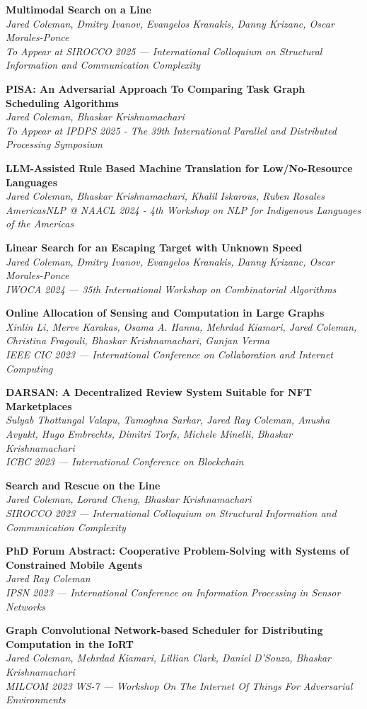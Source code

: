 \documentclass[letterpaper,11pt]{article}
\newcommand{\pub}[3]{
  \vspace{-1pt}\item \textbf{#1} \\ 
    \textit{\small#2} \\
    \textit{\small#3}\vspace{-5pt}
}
\begin{document}
    \pub
    {Multimodal Search on a Line}
    {Jared Coleman, Dmitry Ivanov, Evangelos Kranakis, Danny Krizanc, Oscar Morales-Ponce}
    {To Appear at SIROCCO 2025 --- International Colloquium on Structural Information and Communication Complexity}

    \pub
    {PISA: An Adversarial Approach To Comparing Task Graph Scheduling Algorithms}
    {Jared Coleman, Bhaskar Krishnamachari}
    {To Appear at IPDPS 2025 - The 39th International Parallel and Distributed Processing Symposium}

    \pub
    {LLM-Assisted Rule Based Machine Translation for Low/No-Resource Languages}
    {Jared Coleman, Bhaskar Krishnamachari, Khalil Iskarous, Ruben Rosales}
    {AmericasNLP @ NAACL 2024 - 4th Workshop on NLP for Indigenous Languages of the Americas}

    \pub
    {Linear Search for an Escaping Target with Unknown Speed}
    {Jared Coleman, Dmitry Ivanov, Evangelos Kranakis, Danny Krizanc, Oscar Morales-Ponce}
    {IWOCA 2024 --- 35th International Workshop on Combinatorial Algorithms}

    \pub
    {Online Allocation of Sensing and Computation in Large Graphs}
    {Xinlin Li, Merve Karakas, Osama A. Hanna, Mehrdad Kiamari, Jared Coleman, Christina Fragouli, Bhaskar Krishnamachari, Gunjan Verma}
    {IEEE CIC 2023 --- International Conference on Collaboration and Internet Computing}
    
    \pub
    {DARSAN: A Decentralized Review System Suitable for NFT Marketplaces}
    {Sulyab Thottungal Valapu, Tamoghna Sarkar, Jared Ray Coleman, Anusha Avyukt, Hugo Embrechts, Dimitri Torfs, Michele Minelli, Bhaskar Krishnamachari}
    {ICBC 2023 --- International Conference on Blockchain}

    \pub
    {Search and Rescue on the Line}
    {Jared Coleman, Lorand Cheng, Bhaskar Krishnamachari}
    {SIROCCO 2023 --- International Colloquium on Structural Information and Communication Complexity}

    \pub
    {PhD Forum Abstract: Cooperative Problem-Solving with Systems of Constrained Mobile Agents}
    {Jared Ray Coleman}
    {IPSN 2023 --- International Conference on Information Processing in Sensor Networks}

    \pub
    {Graph Convolutional Network-based Scheduler for Distributing Computation in the IoRT}
    {Jared Coleman, Mehrdad Kiamari, Lillian Clark, Daniel D'Souza, Bhaskar Krishnamachari}
    {MILCOM 2023 WS-7 --- Workshop On The Internet Of Things For Adversarial Environments}
\end{document}
